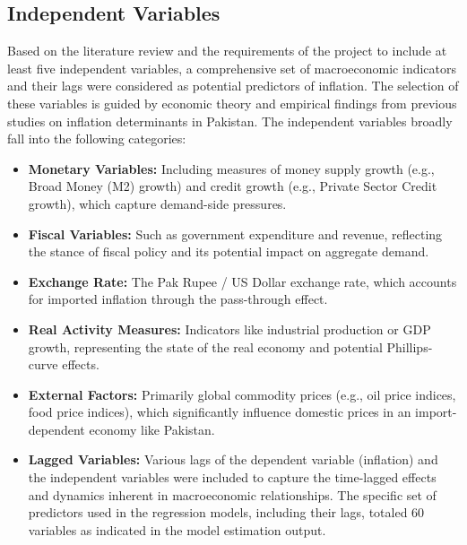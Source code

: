 \documentclass[12pt,a4paper]{article}
\begin{document}
\subsection{Independent Variables}
Based on the literature review and the requirements of the project to include at least five independent variables, a comprehensive set of macroeconomic indicators and their lags were considered as potential predictors of inflation. The selection of these variables is guided by economic theory and empirical findings from previous studies on inflation determinants in Pakistan. The independent variables broadly fall into the following categories:
\begin{itemize}
    \item \textbf{Monetary Variables:} Including measures of money supply growth (e.g., Broad Money (M2) growth) and credit growth (e.g., Private Sector Credit growth), which capture demand-side pressures.
    \item \textbf{Fiscal Variables:} Such as government expenditure and revenue, reflecting the stance of fiscal policy and its potential impact on aggregate demand.
    \item \textbf{Exchange Rate:} The Pak Rupee / US Dollar exchange rate, which accounts for imported inflation through the pass-through effect.
    \item \textbf{Real Activity Measures:} Indicators like industrial production or GDP growth, representing the state of the real economy and potential Phillips-curve effects.
    \item \textbf{External Factors:} Primarily global commodity prices (e.g., oil price indices, food price indices), which significantly influence domestic prices in an import-dependent economy like Pakistan.
    \item \textbf{Lagged Variables:} Various lags of the dependent variable (inflation) and the independent variables were included to capture the time-lagged effects and dynamics inherent in macroeconomic relationships. The specific set of predictors used in the regression models, including their lags, totaled 60 variables as indicated in the model estimation output.
\end{itemize}
\end{document}
